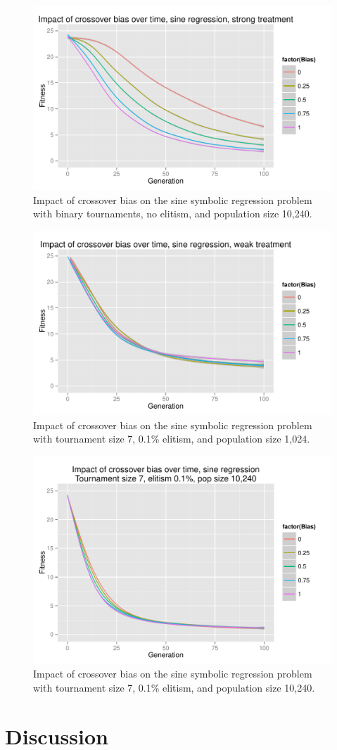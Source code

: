 \documentclass{sig-alternate}
\begin{document}
\begin{figure}
\centering
\includegraphics[width=0.45 \textwidth]{Plots/Sine_XO_fitness_vs_gen_strong.pdf}
\caption{Impact of crossover bias on the sine symbolic regression problem with binary tournaments, no elitism, and 
population size 10,240.}
\label{fig:sineBiasFitnessVsGenStrong}
\end{figure}

\begin{figure}
\centering
\includegraphics[width=0.45 \textwidth]{Plots/Sine_XO_fitness_vs_gen_weak.pdf}
\caption{Impact of crossover bias on the sine symbolic regression problem with tournament size 7, 0.1\% elitism, and 
population size 1,024.}
\label{fig:sineBiasFitnessVsGenWeak}
\end{figure}

\begin{figure}
\centering
\includegraphics[width=0.45 \textwidth]{Plots/Sine_XO_fitness_vs_gen_t2_e01_p10K.pdf}
\caption{Impact of crossover bias on the sine symbolic regression problem with tournament size 7, 0.1\% elitism, and 
population size 10,240.}
\label{fig:sineBiasFitnessVsGenT2E01P10K}
\end{figure}

\section{Discussion} \label{sec:Discussion}
\end{document}
